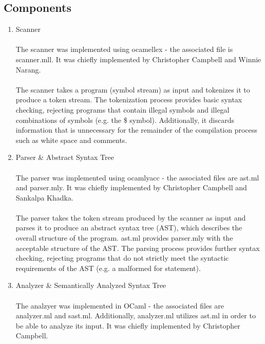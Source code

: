 \subsection{Components}
\begin{enumerate}
\item Scanner\\\\
The scanner was implemented using ocamellex - the associated file is scanner.mll. It was chiefly implemented by Christopher Campbell and Winnie Narang.\\\\
The scanner takes a program (symbol stream) as input and tokenizes it to produce a token stream. The tokenization process provides basic syntax checking, rejecting programs that contain illegal symbols and illegal combinations of symbols (e.g. the \$ symbol). Additionally, it discards information that is unnecessary for the remainder of the compilation process such as white space and comments.\\
\item Parser \& Abstract Syntax Tree\\\\
The parser was implemented using ocamlyacc - the associated files are ast.ml and parser.mly. It was chiefly implemented by Christopher Campbell and Sankalpa Khadka.\\\\
The parser takes the token stream produced by the scanner as input and parses it to produce an abstract syntax tree (AST), which describes the overall structure of the program. ast.ml provides parser.mly with the acceptable structure of the AST. The parsing process provides further syntax checking, rejecting programs that do not strictly meet the syntactic requirements of the AST (e.g. a malformed for statement).\\
\item Analyzer \& Semantically Analyzed Syntax Tree\\\\
The analzyer was implemented in OCaml - the associated files are analyzer.ml and sast.ml. Additionally, analyzer.ml utilizes ast.ml in order to be able to analyze its input. It was chiefly implemented by Christopher Campbell.\\\\

\end{enumerate}
